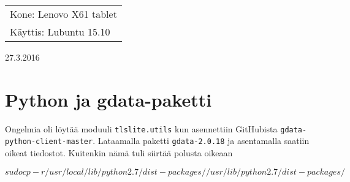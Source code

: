 \documentclass[main.tex]{subfiles}
\begin{document}
\thispagestyle{empty}
\begin{tabular}[t]{l}
Kone: Lenovo X61 tablet\\
Käyttis: Lubuntu 15.10
\end{tabular}
\hfill 27.3.2016

{\section{Python ja gdata-paketti}}

Ongelmia oli löytää moduuli \texttt{tlslite.utils} kun asennettiin GitHubista \texttt{gdata-python-client-master}. Lataamalla paketti \texttt{gdata-2.0.18} ja asentamalla saatiin oikeat tiedostot. Kuitenkin nämä tuli siirtää polusta oikeaan

\[
  sudo cp -r /usr/local/lib/python2.7/dist-packages/ /usr/lib/python2.7/dist-packages/
\]
\end{document}
